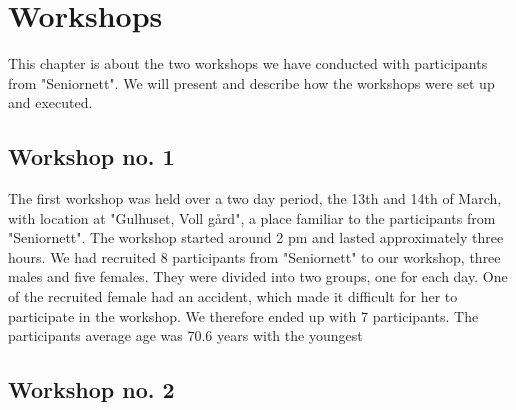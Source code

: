 \chapter{Workshops}
This chapter is about the two workshops we have conducted with participants from "Seniornett". We will present and describe how the workshops were set up and executed.
    
\section{Workshop no. 1}
The first workshop was held over a two day period, the 13th and 14th of March, with location at "Gulhuset, Voll gård", a place familiar to the participants from "Seniornett". The workshop started around 2 pm and lasted approximately three hours. We had recruited 8 participants from "Seniornett" to our workshop, three males and five females. They were divided into two groups, one for each day. One of the recruited female had an accident, which made it difficult for her to participate in the workshop. We therefore ended up with 7 participants. The participants average age was 70.6 years with the youngest   



\section{Workshop no. 2}